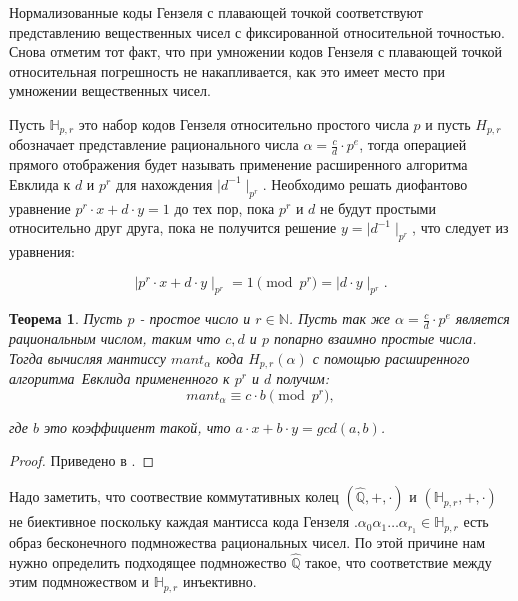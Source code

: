 \documentclass[master, och, diploma, times]{sty/SCWorks}
\theoremstyle{plain}
\newtheorem{thethm}{Теорема}[section]
\theoremstyle{definition}
\numberwithin{equation}{section}
\begin{document}
Нормализованные коды Гензеля с плавающей точкой соответствуют представлению вещественных чисел с фиксированной относительной точностью. Снова отметим тот факт, что при умножении кодов Гензеля с плавающей точкой относительная погрешность не накапливается, как это имеет место при умножении вещественных чисел.

Пусть $\mathbb{H}_{p,r}$ это набор кодов Гензеля относительно простого числа $p$ и пусть $H_{p,r}$ обозначает представление рационального числа $\alpha=\frac{c}{d}\cdot p^e$, тогда операцией прямого отображения будет называть применение расширенного алгоритма Евклида к $d$ и $p^r$ для нахождения $\mid d^{-1} \mid_{p^r}$. Необходимо решать диофантово уравнение $p^r \cdot x + d \cdot y = 1$ до тех пор, пока $p^r$ и $d$ не будут простыми относительно друг друга, пока не получится решение $y=\mid d^{-1} \mid_{p^r}$, что следует из уравнения:

\begin{equation}
\mid p^r \cdot x + d \cdot y \mid_{p^r} = 1 \pmod{p^r} = \mid d \cdot y \mid_{p^r}.
\end{equation}


\begin{thethm}\label{th:forward_mapping}
Пусть $p$ - простое число и $r \in \mathbb{N}$. Пусть так же $\alpha=\frac{c}{d} \cdot p^e$ является рациональным числом, таким что $c, d$ и $p$ попарно взаимно простые числа. Тогда вычисляя мантиссу $mant_{\alpha}$ кода $H_{p,r}(\alpha)$ с помощью \mbox{расширенного} \mbox{алгоритма Евклида} примененного к $p^r$ и $d$ получим:
\begin{equation}
mant_{\alpha} \equiv c \cdot b \pmod {p^r},
\end{equation}

\noindent где $b$ это коэффициент такой, что $a\cdot x+b\cdot y = gcd(a,b)$.
\end{thethm}

\begin{proof} 
Приведено в \cite{bib:numbers:miola}.
\end{proof}


Надо заметить, что соотвествие коммутативных колец $(\hat{\mathbb{Q}},+,\cdot)$ и $(\mathbb{H}_{p,r},+,\cdot)$ не биективное поскольку каждая мантисса кода Гензеля $.\alpha_0\alpha_1\dots\alpha_{r_1} \in \mathbb{H}_{p,r}$ есть образ бесконечного подмножества рациональных чисел. По этой причине нам нужно определить подходящее подмножество $\hat{\mathbb{Q}}$ такое, что соответствие между этим подмножеством и $\mathbb{H}_{p,r}$ \mbox{инъективно}.
\end{document}
